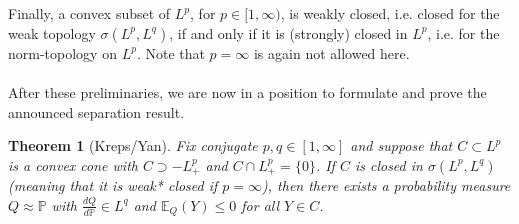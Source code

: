 \documentclass[12pt,a4paper, twoside]{article}
\newtheorem{thm}{Theorem}[section]
\theoremstyle{definition}
\newcommand{\EE}{\mathbb{E}} %
\newcommand{\PP}{\mathbb{P}} %
\begin{document}
\\\\
Finally, a convex subset of $L^p$, for $p \in [1, \infty)$,  is weakly closed, i.e. closed for the weak topology $\sigma( L^p, L^q)$, if and only if it is (strongly) closed in $L^p$, i.e. for the norm-topology on $L^p$. Note that $p= \infty$ is again not allowed here. 
\\\\
After these preliminaries, we are now in a position to formulate and prove the announced separation result. 
\newpage
\begin{thm}[Kreps/Yan] Fix conjugate $p,q \in [1, \infty]$ and suppose that $C \subset L^p$ is a convex cone with $C \supset -L_+^p$ and $C \cap L_+^p= \{0 \}$. If $C$ is closed in $\sigma(L^p, L^q)$ (meaning that it is weak* closed if $p= \infty$), then there exists a probability measure $Q \approx \PP$ with $\frac{dQ}{d \PP} \in L^q$ and $\EE_Q(Y) \leq 0$ for all $Y \in C$. 
\end{thm}
\end{document}
